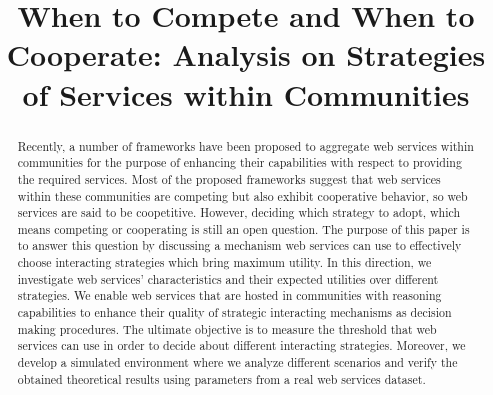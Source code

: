 \documentclass[fleqn]{singlecol-new}
\begin{document}
\setcounter{page}{1}

\LRH{}
\RRH{}

\BottomCatch
{}
\CLline

\subtitle{}

\title{When to Compete and When to Cooperate: Analysis on Strategies of Services within Communities}



\begin{abstract}
Recently, a number of frameworks have been proposed to
aggregate web services within communities for the purpose of
enhancing their capabilities with respect to providing the
required services. Most of the proposed frameworks suggest that
web services within these communities are competing but also
exhibit cooperative behavior, so web services are said to be
coopetitive. However, deciding which strategy to adopt, which
means competing or cooperating is still an open question. The
purpose of this paper is to answer this question by discussing a
mechanism web services can use to effectively choose interacting
strategies which bring maximum utility. In this direction, we
investigate web services' characteristics and their expected
utilities over different strategies. We enable web services that
are hosted in communities with reasoning capabilities to enhance
their quality of  strategic interacting mechanisms as decision
making procedures. The ultimate objective is to measure the
threshold that web services can use in order to decide about
different interacting strategies. Moreover, we develop a simulated
environment where we analyze different scenarios and verify the
obtained theoretical results using parameters from a real web
services dataset.
\end{abstract}



\begin{bio}

\end{bio}

\maketitle
\end{document}
